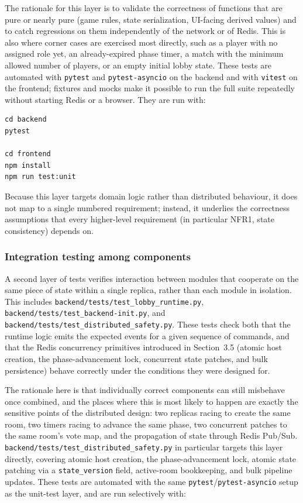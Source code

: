 \documentclass{scrartcl}
\begin{document}
The rationale for this layer is to validate the correctness of functions that are pure or nearly pure (game rules, state serialization, UI-facing derived values) and to catch regressions on them independently of the network or of Redis. This is also where corner cases are exercised most directly, such as a player with no assigned role yet, an already-expired phase timer, a match with the minimum allowed number of players, or an empty initial lobby state. These tests are automated with \texttt{pytest} and \texttt{pytest-asyncio} on the backend and with \texttt{vitest} on the frontend; fixtures and mocks make it possible to run the full suite repeatedly without starting Redis or a browser. They are run with:

\begin{verbatim}
cd backend
pytest

cd frontend
npm install
npm run test:unit
\end{verbatim}

Because this layer targets domain logic rather than distributed behaviour, it does not map to a single numbered requirement; instead, it underlies the correctness assumptions that every higher-level requirement (in particular NFR1, state consistency) depends on.

\subsubsection{Integration testing among components}

A second layer of tests verifies interaction between modules that cooperate on the same piece of state within a single replica, rather than each module in isolation. This includes \texttt{backend/tests/test\_lobby\_runtime.py}, \texttt{backend/tests/test\_backend-init.py}, and \texttt{backend/tests/test\_distributed\_safety.py}. These tests check both that the runtime logic emits the expected events for a given sequence of commands, and that the Redis concurrency primitives introduced in Section~3.5 (atomic host creation, the phase-advancement lock, concurrent state patches, and bulk persistence) behave correctly under the conditions they were designed for.

The rationale here is that individually correct components can still misbehave once combined, and the places where this is most likely to happen are exactly the sensitive points of the distributed design: two replicas racing to create the same room, two timers racing to advance the same phase, two concurrent patches to the same room's vote map, and the propagation of state through Redis Pub/Sub. \texttt{backend/tests/test\_distributed\_safety.py} in particular targets this layer directly, covering atomic host creation, the phase-advancement lock, atomic state patching via a \texttt{state\_version} field, active-room bookkeeping, and bulk pipeline updates. These tests are automated with the same \texttt{pytest}/\texttt{pytest-asyncio} setup as the unit-test layer, and are run selectively with:
\end{document}

